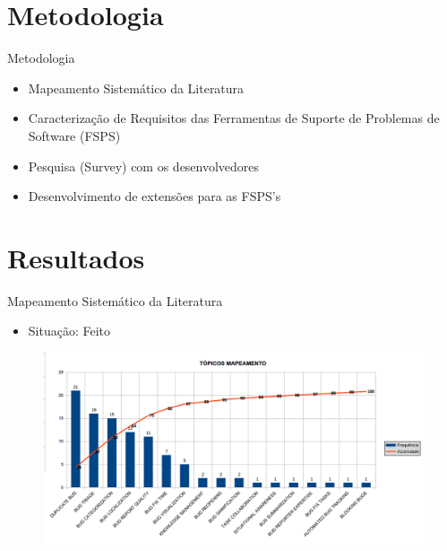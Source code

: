 \documentclass[t,14pt,mathserif]{beamer}
\begin{document}
\section{Metodologia}

\begin{frame}{Metodologia}
	\begin{itemize}
        \item Mapeamento Sistemático da
            Literatura~\cite{kitchenham2007guidelines}
        \item Caracterização de Requisitos das Ferramentas de Suporte de
            Problemas de Software (FSPS)
        \item Pesquisa (Survey) com os
            desenvolvedores~\cite{wohlin2012experimentation}
		\item Desenvolvimento de extensões para as FSPS's
	\end{itemize}
\end{frame}

\section{Resultados}

\begin{frame}{Mapeamento Sistemático da Literatura}
	\begin{itemize}
		\item Situação: Feito
    \end{itemize}

	\begin{figure}[hbtp]
		\centering
		\includegraphics[scale=.39]{../img/mapeamento.png}
	\end{figure}
\end{frame}
\end{document}
